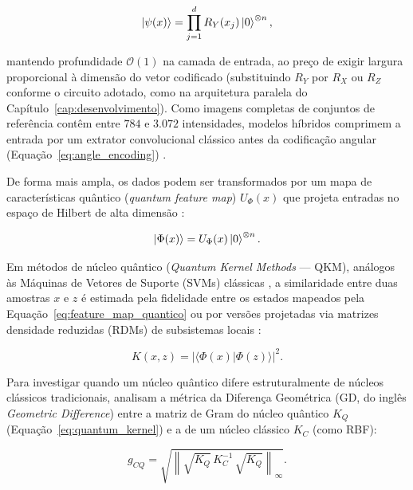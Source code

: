 \documentclass[
    12pt,
    openright,
    oneside,
    a4paper,
    english,
    brazil
]{abntex2}
\begin{document}
\begin{equation}
\label{eq:angle_encoding}
\ket{\psi(x)}
=
\prod_{j=1}^{d}
R_Y(x_j)
\ket{0}^{\otimes n},
\end{equation}

mantendo profundidade \(\mathcal{O}(1)\) na camada de entrada, ao preço de exigir largura proporcional à dimensão do vetor codificado (substituindo \(R_Y\) por \(R_X\) ou \(R_Z\) conforme o circuito adotado, como na arquitetura paralela do Capítulo~\ref{cap:desenvolvimento}). Como imagens completas de conjuntos de referência contêm entre \(784\) e \(3.072\) intensidades, modelos híbridos comprimem a entrada por um extrator convolucional clássico antes da codificação angular (Equação~\eqref{eq:angle_encoding}) \cite{schuld2021effect,senokosov2024qml}.

De forma mais ampla, os dados podem ser transformados por um mapa de características quântico (\textit{quantum feature map}) \(U_{\Phi}(x)\) que projeta entradas no espaço de Hilbert de alta dimensão \cite{havlicek2019supervised,schuld2021effect}:

\begin{equation}
\label{eq:feature_map_quantico}
\ket{\Phi(x)} =
U_{\Phi}(x)\ket{0}^{\otimes n}.
\end{equation}

Em métodos de núcleo quântico (\textit{Quantum Kernel Methods} --- QKM), análogos às Máquinas de Vetores de Suporte (SVMs) clássicas \cite{cortes1995svm}, a similaridade entre duas amostras \(x\) e \(z\) é estimada pela fidelidade entre os estados mapeados pela Equação~\eqref{eq:feature_map_quantico} ou por versões projetadas via matrizes densidade reduzidas (RDMs) de subsistemas locais \cite{havlicek2019supervised,egginger2024hyperparameter}:

\begin{equation}
\label{eq:quantum_kernel}
K(x,z) =
|\langle \Phi(x) | \Phi(z) \rangle|^2.
\end{equation}

Para investigar quando um núcleo quântico difere estruturalmente de núcleos clássicos tradicionais,  analisam a métrica da Diferença Geométrica (GD, do inglês \textit{Geometric Difference}) entre a matriz de Gram do núcleo quântico \(K_Q\) (Equação~\eqref{eq:quantum_kernel}) e a de um núcleo clássico \(K_C\) (como RBF):

\begin{equation}
\label{eq:diferenca_geometrica}
g_{CQ} = \sqrt{\left\| \sqrt{K_Q}\, K_C^{-1}\, \sqrt{K_Q} \right\|_\infty}.
\end{equation}
\end{document}
